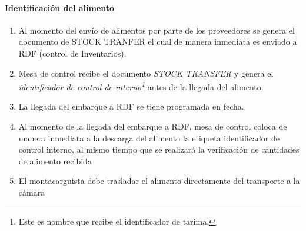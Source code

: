 
\paragraph{Identificación del alimento}
\begin{enumerate}
	\item Al momento del envío de alimentos por parte de los proveedores se genera el documento de STOCK TRANFER el cual de manera inmediata es enviado a \gls{RDF} (control de Inventarios).
	\item Mesa de control recibe el documento \textit{STOCK TRANSFER} y genera el \emph{identificador de control de interno\footnote{Este es nombre que recibe el identificador de tarima.}} antes de la llegada del alimento.
	\item La llegada del embarque a \gls{RDF} se tiene programada en fecha.
	\item Al momento de la llegada del embarque a \gls{RDF}, mesa de control coloca de manera inmediata a la descarga del alimento la etiqueta identificador de control interno, al mismo tiempo que se realizará la verificación de cantidades de alimento recibida
	\item El montacarguista debe trasladar el alimento directamente del transporte a la cámara
\end{enumerate}

